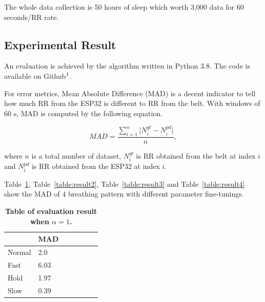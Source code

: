 \documentclass[10pt,letterpaper]{article}
\begin{document}
	The whole data collection is  50 hours of sleep which worth 3,000 data for 60 seconds/RR rate.
	
	\subsection*{Experimental Result}
	\label{result}	
	
	An evaluation is achieved   by the algorithm written in Python 3.8. The code is available on Github$\footnote[1]{https://github.com/rtmtree/CSPS}$.
	
	For error metrics, Mean Absolute Difference (MAD) is a decent indicator to tell how much RR from the ESP32 is different to RR from the belt. With windows of 60 s, MAD is computed by the following equation.
	
	\begin{equation}
		MAD =  \frac{\sum_{i=1}^{n}   \lvert N^{gt}_i - N^{pd}_ i \rvert  }{n} ,
		\label{eq:MAD}
	\end{equation}

where $n$ is a total number of dataset, $N^{gt}_i$ is RR obtained from the belt at index $i$ and $N^{pd}_i$ is RR obtained from the ESP32 at index $i$.

	Table~\ref{table:result1}, Table~\ref{table:result2}, Table~\ref{table:result3} and  Table~\ref{table:result4} show the MAD of 4 breathing pattern with different parameter fine-tunings.
	
	\begin{table}[!ht]
		\begin{adjustwidth}{-2.25in}{0in} %
			\centering
			\caption{
				{\bf Table of evaluation result when $\alpha=1$.}}
			\begin{tabular}{l|llllll}
				\backslashbox{Breathing}{Result} &MAD  \\[1pt]
				\hline
				Normal &2.0 \\[1pt]
				Fast &6.03 \\[1pt]
				Hold &1.97  \\[1pt]
				Slow &0.39 \\[1pt]
			\end{tabular}
			\label{table:result1}
		\end{adjustwidth}
	\end{table}
\end{document}
